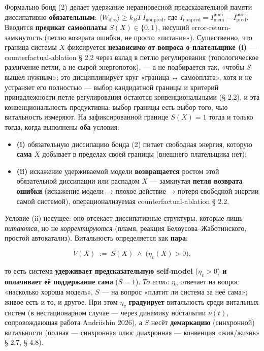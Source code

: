 \documentclass[pdflatex,sn-mathphys-ay]{sn-jnl}
\providecommand{\tightlist}{\setlength{\itemsep}{0pt}\setlength{\parskip}{0pt}}
\begin{document}
Формально бонд (2) делает удержание неравновесной предсказательной памяти диссипативно \textbf{обязательным}: \(\langle W_{\text{diss}} \rangle \ge k_B T\,I_{\text{nonpred}}\), где \(I_{\text{nonpred}} = I_{\text{mem}}^{\text{инст}} - I_{\text{pred}}^{\text{инст}}\). Вводится \textbf{предикат самооплаты} \(S(X) \in \{0, 1\}\), несущий error-return-замкнутость (петлю возврата ошибки, не просто «питание»). Существенно, что граница системы \(X\) фиксируется \textbf{независимо от вопроса о плательщике (i)} --- counterfactual-ablation § 2.2 через вклад в петлю регулирования (топологическое различение петли, а не сырой энергопоток), --- а не подбирается так, «чтобы \(S\) вышел нужным»; это дисциплинирует круг «граница ↔ самооплата», хотя и не устраняет его полностью --- выбор кандидатной границы и критерий принадлежности петле регулирования остаются конвенциональными (§ 2.2), и эта конвенциональность продуктивна: выбор границы есть выбор того, чью витальность измеряют. На зафиксированной границе \(S(X) = 1\) тогда и только тогда, когда выполнены \textbf{оба} условия:

\begin{itemize}
\tightlist
\item
  \textbf{(i)} обязательную диссипацию бонда (2) питает свободная энергия, которую \textbf{сама} \(X\) добывает в пределах своей границы (внешнего плательщика нет);
\item
  \textbf{(ii)} искажение удерживаемой модели \textbf{возвращается} ростом этой обязательной диссипации или распадом \(X\) --- замкнутая \textbf{петля возврата ошибки} (искажение модели → плохое действие → потеря свободной энергии самой системой), операционализуемая counterfactual-ablation § 2.2.
\end{itemize}

Условие (ii) несущее: оно отсекает диссипативные структуры, которые лишь \emph{питаются}, но не \emph{корректируются} (пламя, реакция Белоусова--Жаботинского, простой автокатализ). Витальность определяется как \textbf{пара}:

\[V(X) \;:=\; S(X) \;\wedge\; \big(\eta_v(X) > 0\big),\]

то есть система \textbf{удерживает предсказательную self-model} (\(\eta_v > 0\)) \textbf{и оплачивает её поддержание сама} (\(S = 1\)). \emph{То есть:} \(\eta_v\) отвечает на вопрос «насколько хороша модель», \(S\) --- на вопрос «платит ли система за неё сама»; живое есть и то, и другое. При этом \(\eta_v\) \textbf{градуирует} витальность среди витальных систем (в нестационарном случае --- через динамику ностальгии \(\nu(t)\), сопровождающая работа Andriishin 2026), а \(S\) несёт \textbf{демаркацию} (синхронной) витальности (полная --- синхронная плюс диахронная --- конвенция «жив/жизнь» § 2.7, § 4.8).
\end{document}
